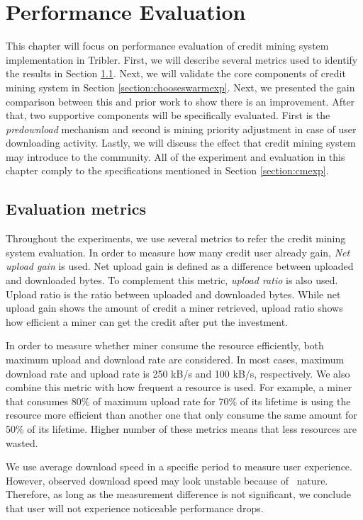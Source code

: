 \chapter{Performance Evaluation}
\label{chp:perfeval}

This chapter will focus on performance evaluation of credit mining system implementation in Tribler. First, we will describe several metrics used to identify the results in Section \ref{section:evalmetrics}. Next, we will validate the core components of credit mining system in Section \ref{section:chooseswarmexp}. Next, we presented the gain comparison between this and prior work to show there is an improvement. After that, two supportive components will be specifically evaluated. First is the \textit{predownload} mechanism and second is mining priority adjustment in case of user downloading activity. Lastly, we will discuss the effect that credit mining system may introduce to the community. All of the experiment and evaluation in this chapter comply to the specifications mentioned in Section \ref{section:cmexp}. 

\section{Evaluation metrics}
\label{section:evalmetrics}
Throughout the experiments, we use several metrics to refer the credit mining system evaluation. In order to measure how many credit user already gain, \textit{Net upload gain}\cite{2015:creditmining:capota} is used. Net upload gain is defined as a difference between uploaded and downloaded bytes. To complement this metric, \textit{upload ratio} is also used. Upload ratio is the ratio between uploaded and downloaded bytes. While net upload gain shows the amount of credit a miner retrieved, upload ratio shows how efficient a miner can get the credit after put the investment.

In order to measure whether miner consume the resource efficiently, both maximum upload and download rate are considered. In most cases, maximum download rate and upload rate is 250 kB/s and 100 kB/s, respectively. We also combine this metric with how frequent a resource is used. For example, a miner that consumes 80\% of maximum upload rate for 70\% of its lifetime is using the resource more efficient than another one that only consume the same amount for 50\% of its lifetime. Higher number of these metrics means that less resources are wasted. 

We use average download speed in a specific period to measure user experience. However, observed download speed may look unstable because of \bt~nature. Therefore, as long as the measurement difference is not significant, we conclude that user will not experience noticeable performance drops. 


